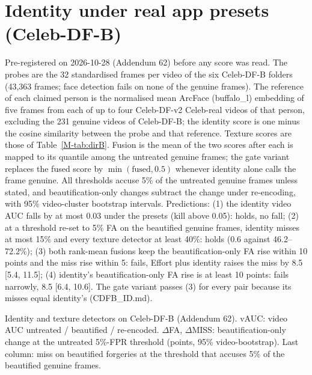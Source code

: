\documentclass[10pt]{article}
\begin{document}
\section{Identity under real app presets (Celeb-DF-B)}
\label{sec:cdfbid}
Pre-registered on 2026-10-28 (Addendum 62) before any score was read. The probes are the 32 standardised frames per video of
the six Celeb-DF-B folders (43,363 frames; face detection fails on none of the genuine frames). The reference of each claimed
person is the normalised mean ArcFace (buffalo\_l) embedding of five frames from each of up to four Celeb-DF-v2 Celeb-real
videos of that person, excluding the 231 genuine videos of Celeb-DF-B; the identity score is one minus the cosine similarity
between the probe and that reference. Texture
scores are those of Table~\ref{M-tab:dirB}. Fusion is the mean of the two scores after each is mapped to its quantile among
the untreated genuine frames; the gate variant replaces the fused score by $\min(\text{fused}, 0.5)$ whenever identity alone
calls the frame genuine. All thresholds accuse 5\% of the untreated genuine frames unless stated, and beautification-only
changes subtract the change under re-encoding, with 95\% video-cluster bootstrap intervals. Predictions: (1) the identity video
AUC falls by at most 0.03 under the presets (kill above 0.05): holds, no fall; (2) at a threshold re-set to 5\% FA on the
beautified genuine frames, identity misses at most 15\% and every texture detector at least 40\%: holds (0.6 against
46.2--72.2\%); (3) both rank-mean fusions keep the beautification-only FA rise within 10 points and the miss rise within 5:
fails, Effort plus identity raises the miss by 8.5 [5.4, 11.5]; (4) identity's beautification-only FA rise is at least 10
points: fails narrowly, 8.5 [6.4, 10.6]. The gate variant passes (3) for every pair because its misses equal identity's
(CDFB\_ID.md).
\begin{table}[H]
\centering
\caption{Identity and texture detectors on Celeb-DF-B (Addendum 62). vAUC: video AUC untreated / beautified / re-encoded.
$\Delta$FA, $\Delta$MISS: beautification-only change at the untreated 5\%-FPR threshold (points, 95\% video-bootstrap). Last
column: miss on beautified forgeries at the threshold that accuses 5\% of the beautified genuine frames.}
\label{tab:cdfbid}
\scriptsize
\begin{adjustbox}{max width=\linewidth}\end{adjustbox}
\end{table}
\end{document}
